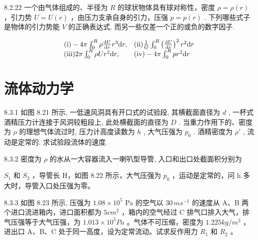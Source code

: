 \begin{problem}{8.2.22}
一个由气体组成的、半径为 $R$ 的球状物体具有球对称性，密度 $\rho = \rho(r)$ ，引力势 $U = U(r)$ ，由压力支承自身的引力，压强 $p = p(r)$ . 下列哪些式子是物体的引力势能 $V$ 的正确表达式. 而另一些仅差一个正的或负的数字因子.

\[
\begin{array}{l l} \text {(i)} - 4 \pi \int_ {0} ^ {R} \rho \frac {\mathrm{d} U}{\mathrm{d} r} r ^ {3} \mathrm{d} r, & \text {(ii)} \frac {1}{G} \int_ {0} ^ {R} \left(\frac {\mathrm{d} U}{\mathrm{d} r}\right) ^ {2} r ^ {2} \mathrm{d} r \\ \text {(iii)} 2 \pi \int_ {0} ^ {R} \rho U r ^ {2} \mathrm{d} r, & \text {(iv)} - 4 \pi \int_ {0} ^ {R} p r ^ {2} \mathrm{d} r \end{array}
\]
\end{problem}
\clearpage


\section{流体动力学}

\begin{problem}{8.3.1}
如图 8.21 所示, 一低速风洞具有开口式的试验段, 其横截面直径为 $d$ , 一杯式酒精压力计连接于风洞较粗段上, 此处横截面的直径为 $D$ . 当重力作用下的、密度为 $\rho$ 的理想气体流过时, 压力计高度读数为 $h$ , 大气压强为 $p_0$ . 酒精密度为 $\rho'$ , 流动是定常的. 求试验段流体的速度.
\begin{center}

\end{center}
\end{problem}
\clearpage


\begin{problem}{8.3.2}
密度为 $\rho$ 的水从一大容器流入一喇叭型导管, 入口和出口处截面积分别为

$S_{1}$ 和 $S_{2}$ ，导管长 H，如图 8.22 所示，大气压强为 $p_{0}$ ，运动是定常的，问 h 多大时，导管入口处压强为零。
\begin{center}

\end{center}
\end{problem}
\clearpage


\begin{problem}{8.3.3}
如图 8.23 所示, 压强为 $1.08 \times 10^{5}$ Pa 的空气以 $30 \, ms^{-1}$ 的速度从 A、B 两个进口流进箱内，进口面积都为 $5cm^{2}$ ，箱内的空气经过 C 排气口排入大气，排气压强等于大气压强，为 $1.013 \times 10^{5}Pa$ 。气体不可压缩，密度为 $1.225kg/m^{3}$ ，进出口 A、B、C 处于同一高度，设为定常流动。试求反作用力 $R_{1}$ 和 $R_{2}$ 。
\begin{center}

\end{center}
\end{problem}
\clearpage


